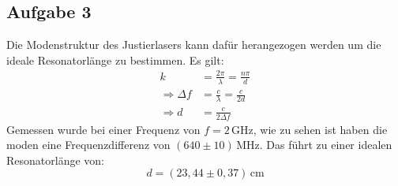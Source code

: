 \subsection{Aufgabe 3}
Die Modenstruktur des Justierlasers kann dafür herangezogen werden um die ideale Resonatorlänge zu bestimmen. Es gilt:
\begin{align}
k &= \frac{2\pi}{\lambda}  = \frac{n\pi}{d} \\
\Rightarrow \Delta f &= \frac{c}{\lambda} = \frac{c}{2d} \\
\Rightarrow d &= \frac{c}{2\Delta f}
\end{align}
Gemessen wurde bei einer Frequenz von $f = 2\, \text{GHz}$, wie zu sehen ist haben die moden eine Frequenzdifferenz von $(640 \pm 10)\, \text{MHz}$. Das führt zu einer idealen Resonatorlänge von:
\begin{equation}
d = (23,44 \pm 0,37)\, \text{cm}
\end{equation}
